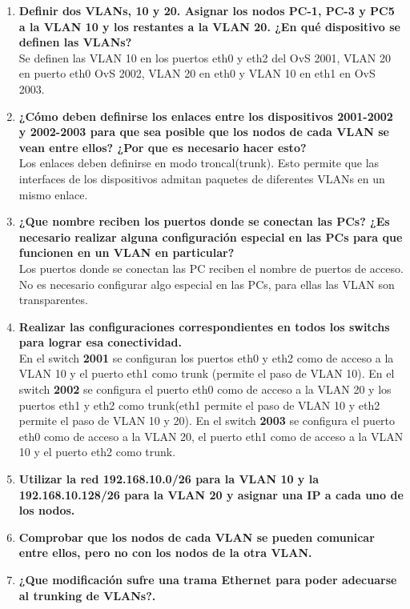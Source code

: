 \documentclass[letterpaper,12pt]{article}
\begin{document}
\begin{enumerate}
	\item \textbf{Definir dos VLANs, 10 y 20. Asignar los nodos PC-1, PC-3 y PC5 a la VLAN 10 y los restantes a la VLAN 20. ¿En qué dispositivo se definen las VLANs?}\\
	Se definen las VLAN 10 en los puertos eth0 y eth2 del OvS 2001, VLAN 20 en puerto eth0 OvS 2002, VLAN 20 en eth0 y VLAN 10 en eth1 en OvS 2003.
	\item \textbf{¿Cómo deben definirse los enlaces entre los dispositivos 2001-2002 y 2002-2003 para que sea posible que los nodos de cada VLAN se vean entre ellos? ¿Por que es necesario hacer esto?} \\
	Los enlaces deben definirse en modo troncal(trunk). Esto permite que las interfaces de los dispositivos admitan paquetes de diferentes VLANs en un mismo enlace.
	\item \textbf{¿Que nombre reciben los puertos donde se conectan las PCs? ¿Es necesario realizar alguna configuración especial en las PCs para que funcionen en un VLAN en particular?}\\
	Los puertos donde se conectan las PC reciben el nombre de puertos de acceso. No es necesario configurar algo especial en las PCs, para ellas las VLAN son transparentes.
	\item \textbf{Realizar las configuraciones correspondientes en todos los switchs para lograr esa conectividad.}\\
	En el switch \textbf{2001} se configuran los puertos eth0 y eth2 como de acceso a la VLAN 10 y el puerto eth1 como trunk (permite el paso de VLAN 10). En el switch \textbf{2002} se configura el puerto eth0 como de acceso a la VLAN 20 y los puertos eth1 y eth2 como trunk(eth1 permite el paso de VLAN 10 y eth2 permite el paso de VLAN 10 y 20). En el switch \textbf{2003} se configura el puerto eth0 como de acceso a la VLAN 20, el puerto eth1 como de acceso a la VLAN 10 y el puerto eth2 como trunk.
	\item \textbf{Utilizar la red 192.168.10.0/26 para la VLAN 10 y la 192.168.10.128/26 para la VLAN 20 y asignar una IP a cada uno de los nodos.} \\
	\item \textbf{Comprobar que los nodos de cada VLAN se pueden comunicar entre ellos, pero no con los nodos de la otra VLAN.} \\
	\item \textbf{¿Que modificación sufre una trama Ethernet para poder adecuarse al trunking de VLANs?.} \\

\end{enumerate}
\end{document}
